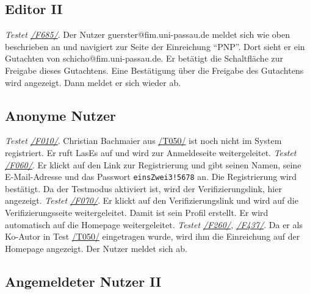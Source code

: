 \subsection{Editor II}
\begin{description}

	 \emph{Testet \hyperref[funkt:685]{/F685/}}.
	Der Nutzer guerster@fim.uni-passau.de meldet sich wie oben beschrieben an und navigiert zur Seite der Einreichung ``P\neq NP''.
	Dort sieht er ein Gutachten von schicho@fim.uni-passau.de.
	Er betätigt die Schaltfläche zur Freigabe dieses Gutachtens.
	Eine Bestätigung über die Freigabe des Gutachtens wird angezeigt.
	Dann meldet er sich wieder ab.

\end{description}

\subsection{Anonyme Nutzer}

\begin{description}
	 \emph{Testet \hyperref[funkt:010]{/F010/}}.
	Christian Bachmaier aus \hyperref[t050]{/T050/} ist noch nicht im System registriert.
	Er ruft LasEs auf und wird zur Anmeldeseite weitergeleitet.
	 \emph{Testet \hyperref[funkt:060]{/F060/}}.
	Er klickt auf den Link zur Registrierung und gibt seinen Namen, seine E-Mail-Adresse und das Passwort \texttt{einsZwei3!5678} an.
	Die Registrierung wird bestätigt.
	Da der Testmodus aktiviert ist, wird der Verifizierungslink, hier angezeigt.
	 \emph{Testet \hyperref[funkt:070]{/F070/}}.
	Er klickt auf den Verifizierungslink und wird auf die Verifizierungsseite weitergeleitet.
	Damit ist sein Profil erstellt.
	Er wird automatisch auf die Homepage weitergeleitet.
	 \emph{Testet \hyperref[funkt:260]{/F260/}, \hyperref[funkt:437]{/F437/}}.
	Da er als Ko-Autor in Test \hyperref[t050]{/T050/} eingetragen wurde, wird ihm die Einreichung auf der Homepage angezeigt.
	Der Nutzer meldet sich ab.
\end{description}

\subsection{Angemeldeter Nutzer II}

